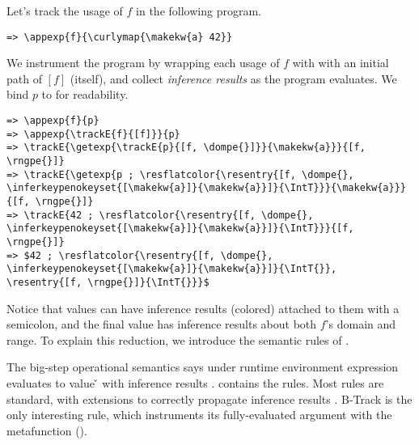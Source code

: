 Let's track the usage of $f$ in the following program.

\begin{Verbatim}[commandchars=\\\{\}, codes={\catcode`$=3\catcode`^=7}]
=> \appexp{f}{\curlymap{\makekw{a} 42}}
\end{Verbatim}

We instrument the program by wrapping each usage of $f$ with \trackEOp{}
with an initial path of $[f]$ (itself), and collect \emph{inference results}
as the program evaluates.
We bind $p$ to {} for readability.

\begin{Verbatim}[commandchars=\\\{\}, codes={\catcode`$=3\catcode`^=7}]
=> \appexp{f}{p}
=> \appexp{\trackE{f}{[f]}}{p}
=> \trackE{\getexp{\trackE{p}{[f, \dompe{}]}}{\makekw{a}}}{[f, \rngpe{}]}
=> \trackE{\getexp{p ; \resflatcolor{\resentry{[f, \dompe{}, \inferkeypenokeyset{[\makekw{a}]}{\makekw{a}}]}{\IntT}}}{\makekw{a}}}{[f, \rngpe{}]}
=> \trackE{42 ; \resflatcolor{\resentry{[f, \dompe{}, \inferkeypenokeyset{[\makekw{a}]}{\makekw{a}}]}{\IntT}}}{[f, \rngpe{}]}
=> $42 ; \resflatcolor{\resentry{[f, \dompe{}, \inferkeypenokeyset{[\makekw{a}]}{\makekw{a}}]}{\IntT{}}, \resentry{[f, \rngpe{}]}{\IntT{}}}$
\end{Verbatim}

Notice that values can have inference results (colored) attached to them with a semicolon,
and the final value has inference results about both $f$'s domain and range.
To explain this reduction, we introduce the semantic rules of \lambdatrack{}.

The big-step operational semantics
{\opsemtrack{\openv{}}{\e{}}{\v{}}{\res{}}}
says under runtime environment \openv{}
expression \e{} evaluates to value \v{}
with inference results \res{}.
 contains the rules.
Most rules are standard, with extensions to correctly
propagate inference results \res{}.
B-Track is the only interesting rule, which instruments
its fully-evaluated argument with the \trackEOp{}
metafunction ().


